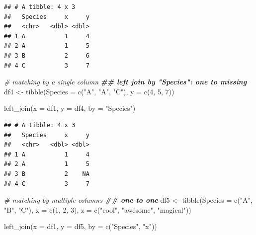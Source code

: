 \documentclass[
]{article}
\newenvironment{Shaded}{\begin{snugshade}}{\end{snugshade}}
\newcommand{\AttributeTok}[1]{\textcolor[rgb]{0.77,0.63,0.00}{#1}}
\newcommand{\CommentTok}[1]{\textcolor[rgb]{0.56,0.35,0.01}{\textit{#1}}}
\newcommand{\DecValTok}[1]{\textcolor[rgb]{0.00,0.00,0.81}{#1}}
\newcommand{\DocumentationTok}[1]{\textcolor[rgb]{0.56,0.35,0.01}{\textbf{\textit{#1}}}}
\newcommand{\FunctionTok}[1]{\textcolor[rgb]{0.00,0.00,0.00}{#1}}
\newcommand{\NormalTok}[1]{#1}
\newcommand{\OtherTok}[1]{\textcolor[rgb]{0.56,0.35,0.01}{#1}}
\newcommand{\StringTok}[1]{\textcolor[rgb]{0.31,0.60,0.02}{#1}}
\begin{document}
\begin{verbatim}
## # A tibble: 4 x 3
##   Species     x     y
##   <chr>   <dbl> <dbl>
## 1 A           1     4
## 2 A           1     5
## 3 B           2     6
## 4 C           3     7
\end{verbatim}

\begin{Shaded}
\begin{Highlighting}[]
\CommentTok{\# matching by a single column}
\DocumentationTok{\#\# left join by "Species": one to missing}
\NormalTok{df4 }\OtherTok{\textless{}{-}} \FunctionTok{tibble}\NormalTok{(}\AttributeTok{Species =} \FunctionTok{c}\NormalTok{(}\StringTok{"A"}\NormalTok{, }\StringTok{"A"}\NormalTok{, }\StringTok{"C"}\NormalTok{),}
              \AttributeTok{y =} \FunctionTok{c}\NormalTok{(}\DecValTok{4}\NormalTok{, }\DecValTok{5}\NormalTok{, }\DecValTok{7}\NormalTok{))}

\FunctionTok{left\_join}\NormalTok{(}\AttributeTok{x =}\NormalTok{ df1,}
          \AttributeTok{y =}\NormalTok{ df4,}
          \AttributeTok{by =} \StringTok{"Species"}\NormalTok{)}
\end{Highlighting}
\end{Shaded}

\begin{verbatim}
## # A tibble: 4 x 3
##   Species     x     y
##   <chr>   <dbl> <dbl>
## 1 A           1     4
## 2 A           1     5
## 3 B           2    NA
## 4 C           3     7
\end{verbatim}

\begin{Shaded}
\begin{Highlighting}[]
\CommentTok{\# matching by multiple columns}
\DocumentationTok{\#\# one to one}
\NormalTok{df5 }\OtherTok{\textless{}{-}} \FunctionTok{tibble}\NormalTok{(}\AttributeTok{Species =} \FunctionTok{c}\NormalTok{(}\StringTok{"A"}\NormalTok{, }\StringTok{"B"}\NormalTok{, }\StringTok{"C"}\NormalTok{),}
              \AttributeTok{x =} \FunctionTok{c}\NormalTok{(}\DecValTok{1}\NormalTok{, }\DecValTok{2}\NormalTok{, }\DecValTok{3}\NormalTok{),}
              \AttributeTok{z =} \FunctionTok{c}\NormalTok{(}\StringTok{"cool"}\NormalTok{, }\StringTok{"awesome"}\NormalTok{, }\StringTok{"magical"}\NormalTok{))}

\FunctionTok{left\_join}\NormalTok{(}\AttributeTok{x =}\NormalTok{ df1,}
          \AttributeTok{y =}\NormalTok{ df5,}
          \AttributeTok{by =} \FunctionTok{c}\NormalTok{(}\StringTok{"Species"}\NormalTok{, }\StringTok{"x"}\NormalTok{))}
\end{Highlighting}
\end{Shaded}
\end{document}
